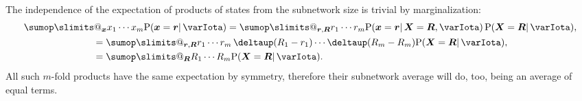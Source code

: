 \documentclass{article}
\makeatletter
\theoremstyle{remark}
\theoremstyle{innote}
\def\sum{\DOTSI\sumop\slimits@}
\newcommand*{\delt}{\deltaup}%
\renewcommand*{\|}{\mathpunct{|}}%
\newcommand*{\p}{\mathrm{P}}%
\theoremstyle{simple}
\newcommand*{\yxx}{x}%
\newcommand*{\yx}{\bm{\yxx}}%
\newcommand*{\yX}{\bm{X}}%
\newcommand*{\yr}{\bm{r}}%
\newcommand*{\yR}{\bm{R}}%
\newcommand*{\yH}{\varIota}
\makeatother
\begin{document}
  \bigskip The independence of the expectation of products of states from
  the subnetwork size is trivial by marginalization:
  \begin{multline}
    \label{eq:margin_products}
    \sum_{\yx} x_1\dotsm x_m \p(\yx =\yr \| \yH)
      =\sum_{\yr,\yR}  r_1\dotsm r_m \p(\yx=\yr \| \yX=\yR,\yH)
      \, \p(\yX=\yR \| \yH),
      \\
      \begin{aligned}
      &=\sum_{\yr,\yR} r_1\dotsm r_m\,\delt(R_1-r_1)\dotsm\delt(R_m-R_m)
      \p(\yX = \yR \| \yH),
      \\
      &=\sum_{\yR} R_1\dotsm R_m \p(\yX =\yR \| \yH).
    \end{aligned}
  \end{multline}
  All such $m$-fold products have the same expectation by symmetry,
  therefore their subnetwork average will do, too, being an average of
  equal terms.
\end{document}
